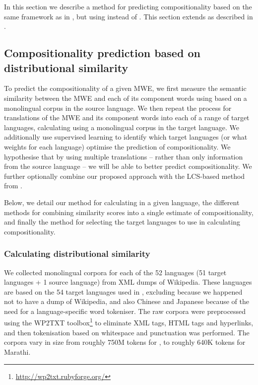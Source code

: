 \documentclass[output=paper
,modfonts
,nonflat]{langsci/langscibook}
\begin{document}
In this section we describe a method for predicting compositionality
based on the same framework as in , but using
 instead of . This section
extends \cite{DBLP:conf/eacl/SalehiCB14} as described in
.

\subsection{Compositionality prediction based on distributional similarity\label{sec:distsimmodel}}

To predict the compositionality of a given MWE, we first measure the
semantic similarity between the MWE and each of its component words
using  based on a monolingual corpus in the
source language.  We then repeat the process for translations of the
MWE and its component words into each of a range of target languages,
calculating  using a monolingual corpus in
the target language. We additionally use supervised learning to
identify which target languages (or what weights for each language)
optimise the prediction of compositionality. We hypothesise that by
using multiple translations -- rather than only information from the
source language -- we will be able to better predict
compositionality. We further optionally combine our proposed approach
with the LCS-based  method from
.

Below, we detail our method for calculating 
in a given language, the different methods for combining similarity
scores into a single estimate of compositionality, and finally the
method for selecting the target languages to use in calculating
compositionality.


\subsubsection{Calculating distributional similarity\label{sec:ds:calculating}}

We collected monolingual corpora for each of the 52 languages (51 target
languages + 1 source language) from XML dumps of Wikipedia. These
languages are based on the 54 target languages used in
, excluding  because we happened not to
have a dump of  Wikipedia, and also Chinese and Japanese
because of the need for a language-specific word tokeniser. The raw
corpora were preprocessed using the WP2TXT
toolbox\footnote{\smaller\url{http://wp2txt.rubyforge.org/}} to
eliminate XML tags, HTML tags and hyperlinks, and then tokenisation
based on whitespace and punctuation was performed. The corpora vary in
size from roughly 750M tokens for , to roughly 640K tokens for
Marathi.
\end{document}
